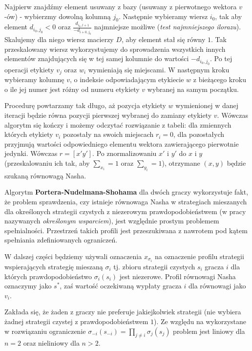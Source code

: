 \documentclass[polish]{standalone}
\begin{document}
Najpierw znajdźmy element usuwany z bazy (usuwany z pierwotnego wektora $v$-ów) - wybierzmy dowolną kolumną $j_0$.
Następnie wybieramy wiersz $i_0$, tak aby element $d_{i_0,j_0} < 0$ oraz $\frac{d_{i_0,l+1}}{-d_{i+0,j_0}}$ najmniejsze
możliwe (\textit{test najmniejszego ilorazu}). Skalujemy dla niego wiersz macierzy $D$, aby element stał się równy $1$.
Tak przeskalowany wiersz wykorzystujemy do sprowadzenia wszystkich innych elementów znajdujących się w tej samej
kolumnie do wartości $-d_{i_0,j_0}$. Po tej operacji etykiety $v_j$ oraz $w_i$ wymieniają się miejscami. W następnym
kroku wybieramy kolumnę $v$, o indeksie odpowiadającym etykiecie $w$ z bieżącego kroku o ile jej numer jest różny od
numeru etykiety $v$ wybranej na samym początku.

Procedurę powtarzamy tak długo, aż pozycja etykiety $w$ wymienionej w danej iteracji będzie równa pozycji pierwszej
wybranej do zamiany etykiety $v$. Wówczas algorytm się kończy i możemy odczytać rozwiązanie z tabeli: dla zmiennych
których etykiety $v_i$ pozostały na swoich miejscach $r_i = 0$, dla pozostałych przyjmują wartości odpowiedniego
elementu wektora zawierającego pierwotnie jedynki. Wówczas $r = [ x' y' ]$. Po znormalizowaniu $x'$ i $y'$ do $x$ i $y$
(przeskalowaniu ich tak, aby $\sum_{x_i} = 1$ oraz $\sum_{y_i} = 1$), otrzymane $(x, y)$ będzie szukaną równowagą Nasha.

Algorytm \textbf{Portera-Nudelmana-Shohama}\cite{PNS-NE} dla dwóch graczy wykorzystuje fakt, że problem sprawdzenia,
czy istnieje równowaga Nasha w strategiach mieszanych dla określonych strategii czystych z niezerowym
prawdopodobieństwem (w pracy nazywanych \textit{określonym wsparciem}), jest względnie
prostym problemem spełnialności. Przestrzeń takich profili jest przeszukiwana z nawrotem pod kątem spełniania
zdefiniowanych ograniczeń.

W dalszej części będziemy używali oznaczenia $x_{\sigma_i}$ na oznaczenie profilu strategii wspierających strategię
mieszaną $\sigma_i$ tj. zbioru strategii czystych $s_i$ gracza $i$ dla których prawdopodobieństwo $\sigma_i(s_i)$ jest
niezerowe. Profil równowagi Nasha oznaczymy jako $s^{*}$, zaś wartość oczekiwaną wypłaty gracza $i$ dla równowagi jako
$v_i$.

Zakłada się, że żaden z graczy nie preferuje jakiejkolwiek strategii (nie wybiera żadnej strategii czystej z
prawdopodobieństwem $1$). Ze względu na wykorzystane w rozwiązaniu ograniczenie $\sigma_{-i}(s_{-i}) = \prod_{j \ne i}
\sigma_j(s_j)$ problem jest liniowy dla $n = 2$ oraz nieliniowy dla $n > 2$.
\end{document}
